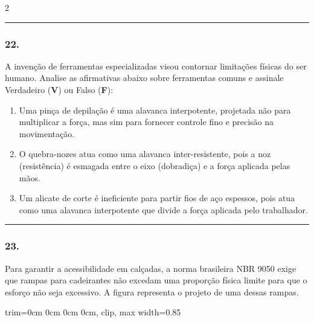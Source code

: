 \documentclass[twoside, 10pt, a4paper]{article}
\newlength{\espacoPreQuestao}\setlength{\espacoPreQuestao}{0.1cm}
\newlength{\espacoQuestao}\setlength{\espacoQuestao}{0.2cm}
\newlength{\espacoAlt}\setlength{\espacoAlt}{0.2cm}
\newcommand{\larguraTikz}{0.85\linewidth}
\begin{document}
\begin{multicols*}{2}
\noindent\textcolor{CorLinha}{\rule{\linewidth}{0.5pt}} 
\par\vspace{\espacoPreQuestao}
\subsubsection*{22.} A invenção de ferramentas especializadas visou contornar limitações físicas do ser humano. Analise as afirmativas abaixo sobre ferramentas comuns e assinale Verdadeiro (\textbf{V}) ou Falso (\textbf{F}):
\begin{enumerate}[label=\Roman*., itemsep=\espacoAlt]
    \item Uma pinça de depilação é uma alavanca interpotente, projetada não para multiplicar a força, mas sim para fornecer controle fino e precisão na movimentação.
    \item O quebra-nozes atua como uma alavanca inter-resistente, pois a noz (resistência) é esmagada entre o eixo (dobradiça) e a força aplicada pelas mãos.
    \item Um alicate de corte é ineficiente para partir fios de aço espessos, pois atua como uma alavanca interpotente que divide a força aplicada pelo trabalhador.
\end{enumerate}
\par\vspace{\espacoQuestao}

\noindent\textcolor{CorLinha}{\rule{\linewidth}{0.5pt}} 
\par\vspace{\espacoPreQuestao}
\subsubsection*{23.} Para garantir a acessibilidade em calçadas, a norma brasileira NBR 9050 exige que rampas para cadeirantes não excedam uma proporção física limite para que o esforço não seja excessivo. A figura representa o projeto de uma dessas rampas.
\begin{center}
\begin{adjustbox}{trim=0cm 0cm 0cm 0cm, clip, max width=\larguraTikz}
\end{adjustbox}
\end{center}
\end{multicols*}
\end{document}
